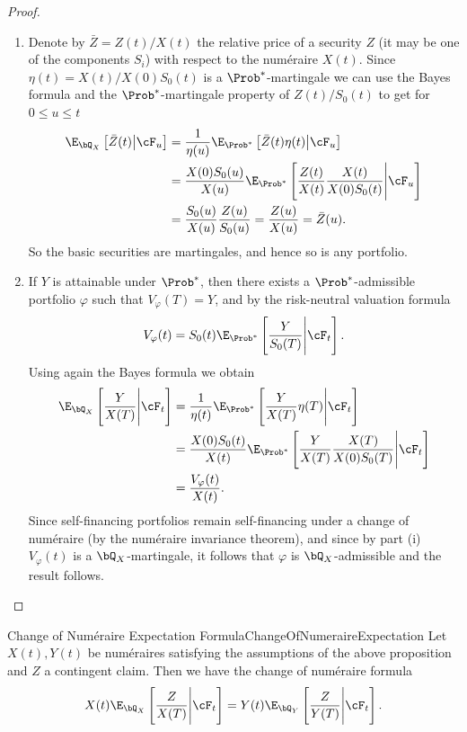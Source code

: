\begin{proof}
	\begin{enumerate}[label=(\roman*), leftmargin=*]
		\item Denote by $\bar{Z} = Z(t)/X(t)$ the relative price of a security $Z$ (it may be one of the components $S_i$) with respect to the num\'{e}raire $X(t)$. Since $\eta(t) = X(t)/X(0)S_0(t)$ is a $\Prob^*$-martingale we can use the Bayes formula and the $\Prob^*$-martingale property of $Z(t)/S_0(t)$ to get for $0 \le u \le t$
		      \begin{align*}
			      \E_{\bQ_X} \left[ \bar{Z}(t) \middle| \cF_u \right]
			       & = \frac{1}{\eta(u)} \E_{\Prob^*} \left[ \bar{Z}(t)\eta(t) \middle| \cF_u \right]                             \\
			       & = \frac{X(0)S_0(u)}{X(u)} \E_{\Prob^*} \left[ \frac{Z(t)}{X(t)} \frac{X(t)}{X(0)S_0(t)} \Bigg| \cF_u \right] \\
			       & = \frac{S_0(u)}{X(u)} \frac{Z(u)}{S_0(u)} = \frac{Z(u)}{X(u)} = \bar{Z}(u).
		      \end{align*}
		      So the basic securities are martingales, and hence so is any portfolio.
		\item If $Y$ is attainable under $\Prob^*$, then there exists a $\Prob^*$-admissible portfolio $\varphi$ such that $V_{\varphi}(T) = Y$, and by the risk-neutral valuation formula
		      \[
			      V_{\varphi}(t) = S_0(t)\E_{\Prob^*} \left[ \frac{Y}{S_0(T)} \Bigg| \cF_t \right].
		      \]
		      Using again the Bayes formula we obtain
		      \begin{align*}
			      \E_{\bQ_X} \left[ \frac{Y}{X(T)} \Bigg| \cF_t \right]
			       & = \frac{1}{\eta(t)} \E_{\Prob^*} \left[ \frac{Y}{X(T)} \eta(T) \Bigg| \cF_t \right]                       \\
			       & = \frac{X(0)S_0(t)}{X(t)} \E_{\Prob^*} \left[ \frac{Y}{X(T)} \frac{X(T)}{X(0)S_0(T)} \Bigg| \cF_t \right] \\
			       & = \frac{V_{\varphi}(t)}{X(t)}.
		      \end{align*}
		      Since self-financing portfolios remain self-financing under a change of num\'{e}raire (by the num\'{e}raire invariance theorem), and since by part (i) $V_{\varphi}(t)$ is a $\bQ_X$-martingale, it follows that $\varphi$ is $\bQ_X$-admissible and the result follows.
	\end{enumerate}
\end{proof}

\begin{cor}{Change of Numéraire Expectation Formula}{ChangeOfNumeraireExpectation}
	Let $X(t), Y(t)$ be numéraires satisfying the assumptions of the above proposition and $Z$ a contingent claim. Then we have the change of numéraire formula
	\begin{equation}\label{eq:ChangeOfNumeraireExpectationFormula}
		X(t)\E_{\bQ_X} \left[ \frac{Z}{X(T)} \Bigg| \cF_t \right] = Y(t)\E_{\bQ_Y} \left[ \frac{Z}{Y(T)} \Bigg| \cF_t \right].
	\end{equation}
\end{cor}

